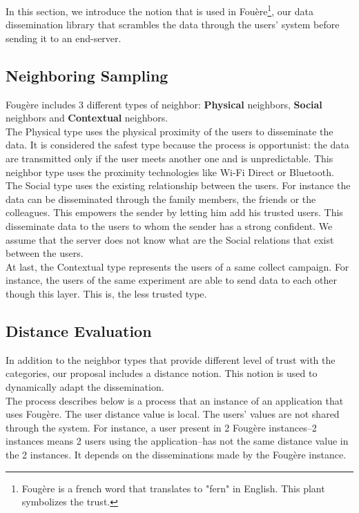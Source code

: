 

In this section, we introduce the notion that is used in Fou\`ere\footnote{Foug\`ere is a french word that translates to "fern" in English. This plant symbolizes the trust.}, our data dissemination library that scrambles the data through the users' system before sending it to an end-server.

\subsection{Neighboring Sampling}

Foug\`ere includes 3 different types of neighbor: \textbf{Physical} neighbors, \textbf{Social} neighbors and \textbf{Contextual} neighbors.
\\

The Physical type uses the physical proximity of the users to disseminate the data.
It is considered the safest type because the process is opportunist: the data are transmitted only if the user meets another one and is unpredictable.
This neighbor type uses the proximity technologies like Wi-Fi Direct or Bluetooth.
\\

The Social type uses the existing relationship between the users.
For instance the data can be disseminated through the family members, the friends or the colleagues.
This empowers the sender by letting him add his trusted users.
This disseminate data to the users to whom the sender has a strong confident.
We assume that the server does not know what are the Social relations that exist between the users.
\\

At last, the Contextual type represents the users of a same collect campaign.
For instance, the users of the same experiment are able to send data to each other though this layer. 
This is, the less trusted type.

\subsection{Distance Evaluation}

In addition to the neighbor types that provide different level of trust with the categories, our proposal includes a distance notion.
This notion is used to dynamically adapt the dissemination.
\\

The process describes below is a process that an instance of an application that uses Foug\`ere.
The user distance value is local.
The users' values are not shared through the system.
For instance, a user present in 2 Foug\`ere instances--2 instances means 2 users using the application--has not the same distance value in the 2 instances.
It depends on the disseminations made by the Foug\`ere instance.
\\

